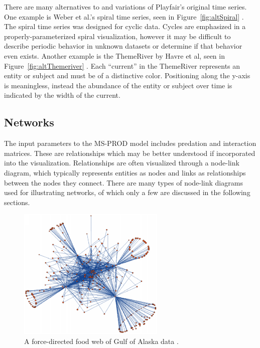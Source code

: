 There are many alternatives to and variations of Playfair's original time series.  One example is Weber et al.'s spiral time series, seen in Figure~\ref{fig:altSpiral} \cite{weber2001}.  The spiral time series was designed for cyclic data.  Cycles are emphasized in a properly-parameterized spiral visualization, however it may be difficult to describe periodic behavior in unknown datasets or determine if that behavior even exists. Another example is the ThemeRiver by Havre et al, seen in Figure~\ref{fig:altThemeriver} \cite{havre2000}.  Each ``current'' in the ThemeRiver represents an entity or subject and must be of a distinctive color.  Positioning along the y-axis is meaningless, instead the abundance of the entity or subject over time is indicated by the width of the current. 

\subsection{Networks}

The input parameters to the MS-PROD model includes predation and interaction matrices.  These are relationships which may be better understood if incorporated into the visualization. Relationships are often visualized through a node-link diagram, which typically represents entities as nodes and links as relationships between the nodes they connect.  There are many types of node-link diagrams used for illustrating networks, of which only a few are discussed in the following sections.

\begin{figure}[h]
	\centering
	\includegraphics[width=7cm]{figures/eps/gaichas.eps}
	\caption{A force-directed food web of Gulf of Alaska data \cite{gaichas2008}.}
	\label{fig:gaichas}
\end{figure}


